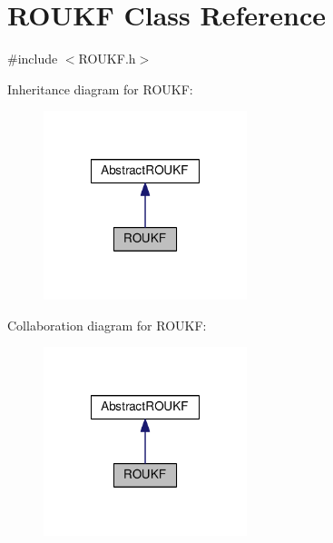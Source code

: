 \hypertarget{classROUKF}{}\section{R\+O\+U\+KF Class Reference}
\label{classROUKF}


{\ttfamily \#include $<$R\+O\+U\+K\+F.\+h$>$}



Inheritance diagram for R\+O\+U\+KF\+:\nopagebreak
\begin{figure}[H]
\begin{center}
\leavevmode
\includegraphics[width=168pt]{classROUKF__inherit__graph}
\end{center}
\end{figure}


Collaboration diagram for R\+O\+U\+KF\+:\nopagebreak
\begin{figure}[H]
\begin{center}
\leavevmode
\includegraphics[width=168pt]{classROUKF__coll__graph}
\end{center}
\end{figure}
